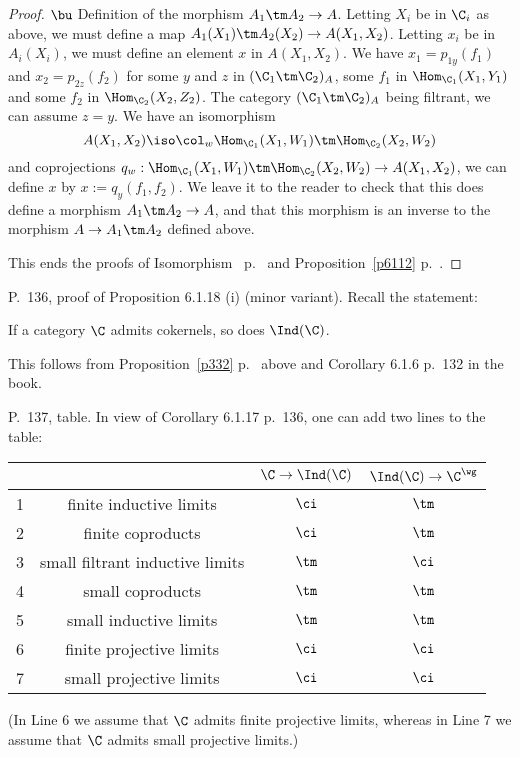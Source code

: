 \documentclass[12pt]{article}
\theoremstyle{remark}
\theoremstyle{definition}
\begin{document}
\begin{proof}
\nn$\bu$ Definition of the morphism $A_1\tm A_2\to A$. Letting $X_i$ be in $\C_i$ as above, we must define a map $A_1(X_1)\tm A_2(X_2)\to A(X_1,X_2)$. Letting $x_i$ be in $A_i(X_i)$, we must define an element $x$ in $A(X_1,X_2)$. We have $x_1=p_{1y}(f_1)$ and $x_2=p_{2z}(f_2)$ for some $y$ and $z$ in $(\C_1\tm\C_2)_A$, some $f_1$ in $\Hom_{\C_1}(X_1,Y_1)$ and some $f_2$ in $\Hom_{\C_2}(X_2,Z_2)$. The category $(\C_1\tm\C_2)_A$ being filtrant, we can assume $z=y$. We have an isomorphism 
$$
A(X_1,X_2)\iso\col_w\Hom_{\C_1}(X_1,W_1)\tm\Hom_{\C_2}(X_2,W_2)
$$ 
and coprojections $q_w:\Hom_{\C_1}(X_1,W_1)\tm\Hom_{\C_2}(X_2,W_2)\to A(X_1,X_2)$, we can define $x$ by $x:=q_y(f_1,f_2)$. We leave it to the reader to check that this does define a morphism $A_1\tm A_2\to A$, and that this morphism is an inverse to the morphism $A\to A_1\tm A_2$ defined above.

This ends the proofs of Isomorphism~ p.~ and Proposition~\ref{p6112} p.~. 
\end{proof} 



\begin{s} 
P.~136, proof of Proposition 6.1.18 (i) (minor variant). Recall the statement: \begin{prop}[Proposition 6.1.18 (i) p.~136] 
If a category $\C$ admits cokernels, so does $\Ind(\C)$. 
\end{prop} 
This follows from Proposition~\ref{p332} p.~ above and Corollary 6.1.6 p.~132 in the book. 
\end{s}

\begin{s} 
P.~137, table. In view of Corollary 6.1.17 p.~136, one can add two lines to the table:\bigskip 

\begin{center}
\begin{tabular}{|c|c|c|c|}\hline
&&$\C\to\Ind(\C)$&$\Ind(\C)\to\C^\wg$\\ \hline
1&finite inductive limits&$\ci$&$\tm$\\ \hline
2&finite coproducts&$\ci$&$\tm$\\ \hline
3&small filtrant inductive limits&$\tm$&$\ci$\\ \hline
4&small coproducts&$\tm$&$\tm$\\ \hline
5&small inductive limits&$\tm$&$\tm$\\ \hline
6&finite projective limits&$\ci$&$\ci$\\ \hline
7&small projective limits&$\ci$&$\ci$\\ \hline
\end{tabular}
\end{center}%
\nn(In Line 6 we assume that $\C$ admits finite projective limits, whereas in Line 7 we assume that $\C$ admits small projective limits.)%
\end{s}
\end{document}
